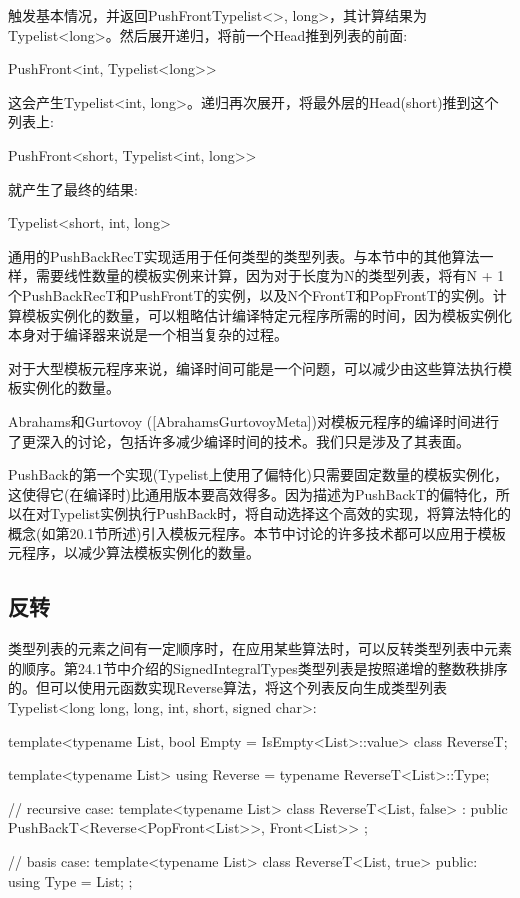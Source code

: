 触发基本情况，并返回PushFrontTypelist<>, long>，其计算结果为Typelist<long>。然后展开递归，将前一个Head推到列表的前面:

\begin{cpp}
PushFront<int, Typelist<long>>
\end{cpp}

这会产生Typelist<int, long>。递归再次展开，将最外层的Head(short)推到这个列表上:

\begin{cpp}
PushFront<short, Typelist<int, long>>
\end{cpp}

就产生了最终的结果:

\begin{cpp}
Typelist<short, int, long>
\end{cpp}

通用的PushBackRecT实现适用于任何类型的类型列表。与本节中的其他算法一样，需要线性数量的模板实例来计算，因为对于长度为N的类型列表，将有N + 1个PushBackRecT和PushFrontT的实例，以及N个FrontT和PopFrontT的实例。计算模板实例化的数量，可以粗略估计编译特定元程序所需的时间，因为模板实例化本身对于编译器来说是一个相当复杂的过程。

对于大型模板元程序来说，编译时间可能是一个问题，可以减少由这些算法执行模板实例化的数量。

\begin{notice}Abrahams和Gurtovoy ([AbrahamsGurtovoyMeta])对模板元程序的编译时间进行了更深入的讨论，包括许多减少编译时间的技术。我们只是涉及了其表面。
\end{notice}

PushBack的第一个实现(Typelist上使用了偏特化)只需要固定数量的模板实例化，这使得它(在编译时)比通用版本要高效得多。因为描述为PushBackT的偏特化，所以在对Typelist实例执行PushBack时，将自动选择这个高效的实现，将算法特化的概念(如第20.1节所述)引入模板元程序。本节中讨论的许多技术都可以应用于模板元程序，以减少算法模板实例化的数量。

\subsection{反转}

类型列表的元素之间有一定顺序时，在应用某些算法时，可以反转类型列表中元素的顺序。第24.1节中介绍的SignedIntegralTypes类型列表是按照递增的整数秩排序的。但可以使用元函数实现Reverse算法，将这个列表反向生成类型列表Typelist<long long, long, int, short, signed char>:

\begin{cpp}
template<typename List, bool Empty = IsEmpty<List>::value>
class ReverseT;

template<typename List>
using Reverse = typename ReverseT<List>::Type;

// recursive case:
template<typename List>
class ReverseT<List, false>
: public PushBackT<Reverse<PopFront<List>>, Front<List>> { };

// basis case:
template<typename List>
class ReverseT<List, true>
{
	public:
	using Type = List;
};
\end{cpp}

